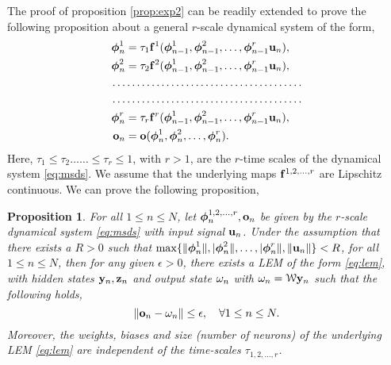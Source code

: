 \documentclass{article} \usepackage{iclr2022_conference,times}
\newcommand{\by}{{\bf y}}
\newcommand{\bz}{{\bf z}}
\newcommand{\bu}{{\bf u}}
\newcommand{\bh}{{\boldsymbol{\phi}}}
\newcommand{\bo}{{\bf o}}
\newcommand{\bif}{{\bf f}}
\newcommand{\cW}{\EuScript{W}}
\newcommand{\bom}{{\bf \omega}}
\newtheorem{proposition}[theorem]{Proposition}
\begin{document}
The proof of proposition \ref{prop:exp2} can be readily extended to prove the following proposition about a general $r$-scale dynamical system of the form, 
\begin{equation}
    \label{eq:msds}
    \begin{aligned}
    \bh^1_{n} &= \tau_1 \bif^1(\bh^1_{n-1},\bh^2_{n-1},\ldots,\bh^r_{n-1}\bu_n), \\
    \bh^2_{n} &= \tau_2 \bif^2(\bh^1_{n-1},\bh^2_{n-1},\ldots,\bh^r_{n-1}\bu_n), \\
    \ldots &\ldots \ldots \ldots \ldots \ldots \ldots \ldots \ldots \ldots \ldots \ldots \ldots\\
    \ldots &\ldots \ldots \ldots \ldots \ldots \ldots \ldots \ldots \ldots \ldots \ldots \ldots \\
    \bh^r_{n} &= \tau_r \bif^r(\bh^1_{n-1},\bh^2_{n-1},\ldots,\bh^r_{n-1}\bu_n), \\
  \bo_n &= \bo(\bh^1_n,\bh^2_n,\ldots,\bh^r_n).
  \end{aligned}
\end{equation}
Here, $\tau_1 \leq \tau_2 \ldots \ldots \leq \tau_r \leq 1$, with $r > 1$, are the $r$-time scales of the dynamical system \eqref{eq:msds}. We assume that the underlying maps $\bif^{1,2,\ldots,r}$ are Lipschitz continuous. We can prove the following proposition, 
\begin{proposition}
\label{prop:mts}
For all $1\leq n \leq N$, let $\bh^{1,2,\ldots,r}_n,\bo_n$ be given by the $r$-scale dynamical system \eqref{eq:msds} with input signal $\bu_n$. Under the assumption that there exists a $R > 0$ such that $\max\{\|\bh^1_n\|, |\bh^2_n\|,\ldots, |\bh^r_n\|,\|\bu_n\|\} < R$, for all $1 \leq n \leq N$, then for any given $\epsilon > 0$, there exists a LEM of the form \eqref{eq:lem}, with hidden states $\by_n,\bz_n$ and output state $\bom_n$ with $\bom_n = \cW \by_n$ such that 
the following holds,
\begin{equation}
    \label{eq:expms}
    \|\bo_n - \bom_n\| \leq \epsilon, \quad \forall 1 \leq n \leq N.
\end{equation}
Moreover, the weights, biases and size (number of neurons) of the underlying LEM \eqref{eq:lem} are \emph{independent} of the time-scales $\tau_{1,2,\ldots,r}$.
\end{proposition}
\end{document}
